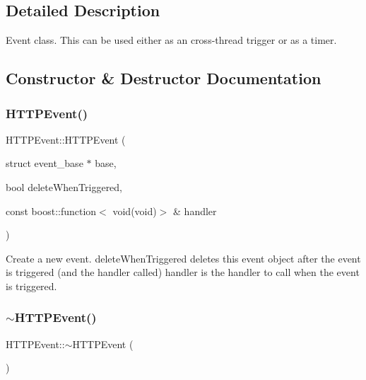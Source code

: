 \subsection{Detailed Description}
Event class. This can be used either as an cross-\/thread trigger or as a timer. 

\subsection{Constructor \& Destructor Documentation}
\mbox{\label{class_h_t_t_p_event_ad7598146077dac606ccf4c9948040508}} 
\subsubsection{\texorpdfstring{H\+T\+T\+P\+Event()}{HTTPEvent()}}
{\footnotesize\ttfamily H\+T\+T\+P\+Event\+::\+H\+T\+T\+P\+Event (\begin{DoxyParamCaption}\item[{struct event\+\_\+base $\ast$}]{base,  }\item[{bool}]{delete\+When\+Triggered,  }\item[{const boost\+::function$<$ void(void)$>$ \&}]{handler }\end{DoxyParamCaption})}

Create a new event. delete\+When\+Triggered deletes this event object after the event is triggered (and the handler called) handler is the handler to call when the event is triggered. \mbox{\label{class_h_t_t_p_event_a3f216c67f9c4732bac686744a9c527d7}} 
\subsubsection{\texorpdfstring{$\sim$\+H\+T\+T\+P\+Event()}{~HTTPEvent()}}
{\footnotesize\ttfamily H\+T\+T\+P\+Event\+::$\sim$\+H\+T\+T\+P\+Event (\begin{DoxyParamCaption}{ }\end{DoxyParamCaption})}




